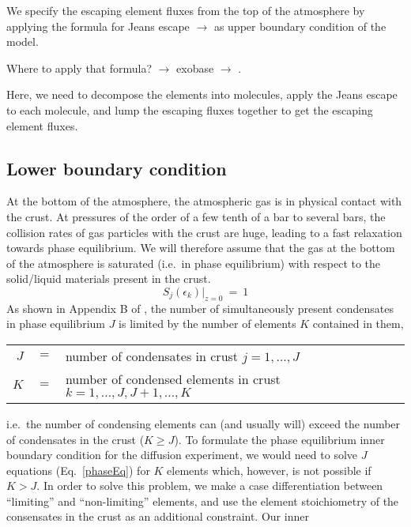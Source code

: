 \documentclass[11pt]{article}
\def\ek{\epsilon_k}
\begin{document}
We specify the escaping element fluxes from the top of the atmosphere 
by applying the formula for Jeans escape $\to$ \citet{Tian2015} as
upper boundary condition of the model.

\noindent Where to apply that formula? $\to$ exobase $\to$ \citet{Volkov2011}.

\noindent Here, we need to decompose the elements into molecules,
apply the Jeans escape to each molecule, and lump the escaping fluxes
together to get the escaping element fluxes. 

\subsection{Lower boundary condition}
\label{LowerBound}

At the bottom of the atmosphere, the atmospheric gas is in physical contact
with the crust. At pressures of the order of a few tenth of a bar to
several bars, the collision rates of gas particles with the crust are
huge, leading to a fast relaxation towards phase equilibrium.  We will
therefore assume that the gas at the bottom of the atmosphere is
saturated (i.e.\ in phase equilibrium) with respect to the solid/liquid 
materials present in the crust.
\begin{equation}
  S_j(\ek)\Big|_{z=0} ~=~ 1
  \label{phaseEq}
\end{equation}
As shown in Appendix B of \citep{Woitke2017}, the number of
simultaneously present condensates in phase equilibrium $J$ is limited
by the number of elements $K$ contained in them,
\smallskip
\begin{center}
\begin{tabular}{rcl}
  $J$ &$=$& number of condensates in crust $j=1,...,J$\\
  $K$ &$=$& number of condensed elements in crust $k=1,...,J,J+1,...,K$ \\
\end{tabular}
\end{center} 
i.e.\ the number of condensing elements can (and usually will) exceed
the number of condensates in the crust ($K\geq J$). To formulate the
phase equilibrium inner boundary condition for the diffusion
experiment, we would need to solve $J$ equations (Eq.~\ref{phaseEq})
for $K$ elements which, however, is not possible if $K>J$. In order to solve
this problem, we make a case differentiation between ``limiting'' and
``non-limiting'' elements, and use the element stoichiometry of the
consensates in the crust as an additional constraint. Our inner
\end{document}

